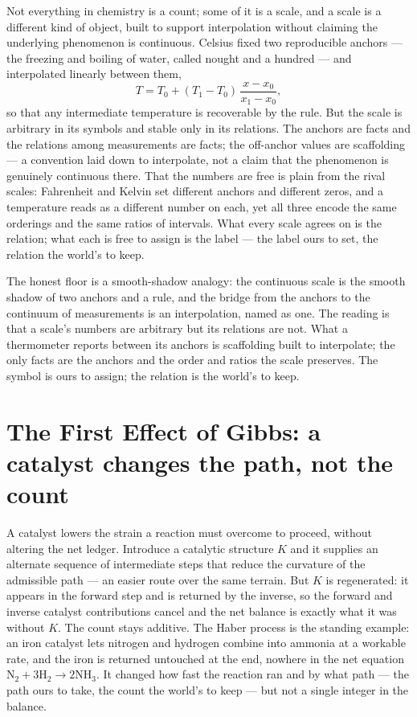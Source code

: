 Not everything in chemistry is a count; some of it is a scale, and a scale is a different kind of object,
built to support interpolation without claiming the underlying phenomenon is continuous. Celsius fixed two
reproducible anchors --- the freezing and boiling of water, called nought and a hundred --- and interpolated
linearly between them,
\begin{equation}
  T = T_0 + (T_1 - T_0)\,\frac{x - x_0}{x_1 - x_0},
\end{equation}
so that any intermediate temperature is recoverable by the rule. But the scale is arbitrary in its symbols and
stable only in its relations. The anchors are facts and the relations among measurements are facts; the off-anchor
values are scaffolding --- a convention laid down to interpolate, not a claim that the phenomenon is genuinely
continuous there. That the numbers are free is plain from the rival scales: Fahrenheit and Kelvin set
different anchors and different zeros, and a temperature reads as a different number on each, yet all three
encode the same orderings and the same ratios of intervals. What every scale agrees on is the relation; what
each is free to assign is the label --- the label ours to set, the relation the world's to keep.

The honest floor is a smooth-shadow analogy: the continuous scale is the smooth shadow of two anchors and a
rule, and the bridge from the anchors to the continuum of measurements is an interpolation, named as one. The
reading is that a scale's numbers are arbitrary but its relations are not. What a thermometer reports between
its anchors is scaffolding built to interpolate; the only facts are the anchors and the order and ratios the
scale preserves. The symbol is ours to assign; the relation is the world's to keep.

\section{The First Effect of Gibbs: a catalyst changes the path, not the count}
\label{se:gibbs-catalyst}

A catalyst lowers the strain a reaction must overcome to proceed, without altering the net ledger. Introduce a
catalytic structure $K$ and it supplies an alternate sequence of intermediate steps that reduce the curvature
of the admissible path --- an easier route over the same terrain. But $K$ is regenerated: it appears in the
forward step and is returned by the inverse, so the forward and inverse catalyst contributions cancel and the
net balance is exactly what it was without $K$. The count stays additive. The Haber process is the standing
example: an iron catalyst lets nitrogen and hydrogen combine into ammonia at a workable rate, and the iron is
returned untouched at the end, nowhere in the net equation $\mathrm{N}_2 + 3\mathrm{H}_2 \to 2\mathrm{NH}_3$.
It changed how fast the reaction ran and by what path --- the path ours to take, the count the world's to
keep --- but not a single integer in the balance.

